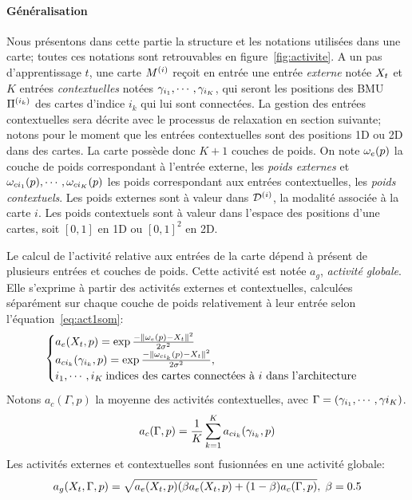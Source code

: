 \paragraph{Généralisation}

Nous présentons dans cette partie la structure et les notations utilisées dans une carte; toutes ces notations sont retrouvables en figure~\ref{fig:activite}.
A un pas d'apprentissage $t$, une carte $M^{({i})}$ reçoit en entrée une entrée \emph{externe} notée $X_t$ et $K$ entrées \emph{contextuelles} notées $\gamma_{i_1},\cdots,\gamma_{i_K}$, qui seront les positions des BMU $\Pi^{({i_k})}$ des cartes d'indice $i_k$ qui lui sont connectées. La gestion des entrées contextuelles sera décrite avec le processus de relaxation en section suivante; notons pour le moment que les entrées contextuelles sont des positions 1D ou 2D dans des cartes. 
La carte possède donc $K+1$ couches de poids. On  note $\omega_e(p)$ la couche de poids correspondant à l'entrée externe, les \emph{poids externes} et $\omega_{ci_1}(p), \cdots, \omega_{ci_K}(p)$ les poids correspondant aux entrées contextuelles, les \emph{poids contextuels}. Les poids externes sont à valeur dans $\mathcal{D}^{({i})}$, la modalité associée à la carte $i$. Les poids contextuels sont à valeur dans l'espace des positions d'une cartes, soit $[0,1]$ en 1D ou $[0,1]^2$ en 2D.

Le calcul de l'activité relative aux entrées de la carte dépend à présent de plusieurs entrées et couches de poids. Cette activité est notée $a_g$, \emph{activité globale}.
Elle s'exprime à partir des activités externes et contextuelles, calculées séparément sur chaque couche de poids relativement à leur entrée selon l'équation~\ref{eq:act1som}:
\begin{equation}
\label{eq:activite}
\begin{cases}
a_e(X_t,p) = \exp\frac{-\lVert \omega_e(p)-X_t \rVert^2}{2\sigma^2} \\
a_{ci_k}(\gamma_{i_k},p) = \exp\frac{-\lVert \omega_{ci_k}(p)-X_t \rVert ^2}{2\sigma^2}, \\
i_1, \cdots, i_K\: \text{indices des cartes connectées à $i$ dans l'architecture}
\end{cases}
\end{equation}
Notons $a_c(\Gamma,p)$ la moyenne des activités contextuelles, avec $\Gamma = (\gamma_{i_1}, \cdots, \gamma{i_K})$.
\begin{equation}
a_c(\Gamma,p) = \frac{1}{K}\sum_{k=1}^K {a_{ci_k}(\gamma_{i_k},p)}
\end{equation}
Les activités externes et contextuelles sont fusionnées en une activité globale:
\begin{equation}
\label{eq:global_act}
a_g(X_t,\Gamma,p) = \sqrt{a_e(X_t,p)(\beta a_e(X_t,p) + (1-\beta) a_c(\Gamma,p)}, \; \beta=0.5
\end{equation} 

